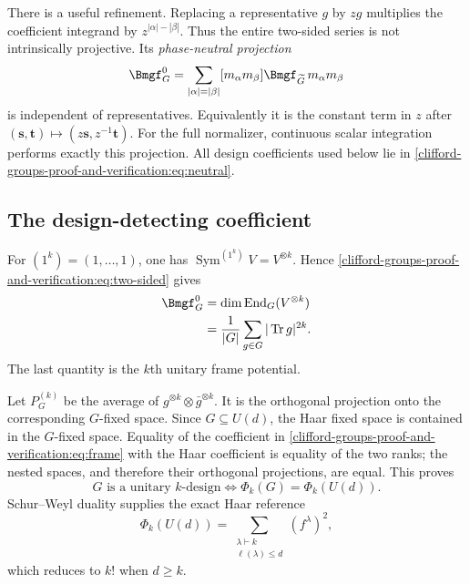 \documentclass[10pt]{article}
\begin{document}
There is a useful refinement.  Replacing a representative $g$ by $zg$
multiplies the coefficient integrand by $z^{|\alpha|-|\beta|}$.  Thus the
entire two-sided series is not intrinsically projective.  Its
\emph{phase-neutral projection}
\begin{equation}\label{clifford-groups-proof-and-verification:eq:neutral}
\Bmgf_G^0=\sum_{|\alpha|=|\beta|}
[m_\alpha m_\beta]\Bmgf_{\widetilde G}\,m_\alpha m_\beta
\end{equation}
is independent of representatives.  Equivalently it is the constant term in
$z$ after $(\mathbf s,\mathbf t)\mapsto(z\mathbf s,z^{-1}\mathbf t)$.
For the full normalizer, continuous scalar integration performs exactly this
projection.  All design coefficients used below lie in \eqref{clifford-groups-proof-and-verification:eq:neutral}.

\subsection{The design-detecting coefficient}
For $(1^k)=(1,\ldots,1)$, one has
$\operatorname{Sym}^{(1^k)}V=V^{\otimes k}$.  Hence \eqref{clifford-groups-proof-and-verification:eq:two-sided}
gives
\begin{align}
[m_{(1^k)}(\mathbf s)m_{(1^k)}(\mathbf t)]\Bmgf_G^0
&=\dim\operatorname{End}_G(V^{\otimes k})\\
&=\frac1{|G|}\sum_{g\in G}|\operatorname{Tr}g|^{2k}.
\label{clifford-groups-proof-and-verification:eq:frame}
\end{align}
The last quantity is the $k$th unitary frame potential.

Let $P_G^{(k)}$ be the average of
$g^{\otimes k}\otimes\bar g^{\otimes k}$.  It is the orthogonal projection
onto the corresponding $G$-fixed space.  Since $G\subseteq U(d)$, the Haar
fixed space is contained in the $G$-fixed space.  Equality of the coefficient
in \eqref{clifford-groups-proof-and-verification:eq:frame} with the Haar coefficient is equality of the two ranks;
the nested spaces, and therefore their orthogonal projections, are equal.
This proves
\[
\boxed{G\text{ is a unitary }k\text{-design}\iff
\Phi_k(G)=\Phi_k(U(d)).}
\]
Schur--Weyl duality supplies the exact Haar reference
\[
\Phi_k(U(d))=\sum_{\substack{\lambda\vdash k\\\ell(\lambda)\leq d}}
(f^\lambda)^2,
\]
which reduces to $k!$ when $d\geq k$.
\end{document}
